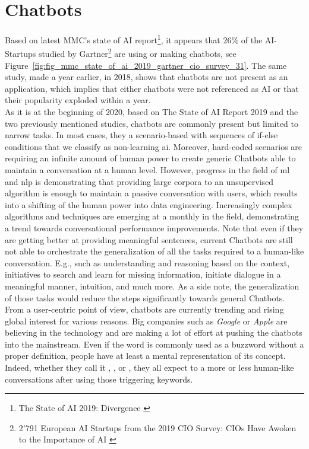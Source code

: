 \chapter{Chatbots}
\label{chap:chatbots}

Based on latest MMC's state of AI report\footnote{The State of AI 2019: Divergence \autocite{report:Kelnar2019}}, it appears that 26\% of the AI-Startups studied by Gartner\footnote{2'791 European AI Startups from the 2019 CIO Survey: CIOs Have Awoken to the Importance of AI \autocite{online:gartner_2019_ai_survey}} are using or making chatbots, see Figure~\ref{fig:fig_mmc_state_of_ai_2019_gartner_cio_survey_31}. The same study, made a year earlier, in 2018, shows that chatbots are not present as an application, which implies that either chatbots were not referenced as AI or that their popularity exploded within a year.\\

As it is at the beginning of 2020, based on The State of AI Report 2019 \autocite{studies:state_of_ai_2019} and the two previously mentioned studies, chatbots are commonly present but limited to narrow tasks. In most cases, they a scenario-based with sequences of if-else conditions that we classify as non-learning \gls{ai}. Moreover, hard-coded scenarios are requiring an infinite amount of human power to create generic Chatbots able to maintain a conversation at a human level. However, progress in the field of \gls{ml} and \gls{nlp} is demonstrating that providing large corpora to an unsupervised algorithm is enough to maintain a passive conversation with users, which results into a shifting of the human power into data engineering. Increasingly complex algorithms and techniques are emerging at a monthly in the field, demonstrating a trend towards conversational performance improvements. Note that even if they are getting better at providing meaningful sentences, current Chatbots are still not able to orchestrate the generalization of all the tasks required to a human-like conversation. E.g., such as understanding and reasoning based on the context, initiatives to search and learn for missing information, initiate dialogue in a meaningful manner, intuition, and much more. As a side note, the generalization of those tasks would reduce the steps significantly towards general Chatbots.\\

From a user-centric point of view, chatbots are currently trending and rising global interest for various reasons. Big companies such as \textit{Google} or \textit{Apple} are believing in the technology and are making a lot of effort at pushing the chatbots into the mainstream. Even if the word  is commonly used as a buzzword without a proper definition, people have at least a mental representation of its concept. Indeed, whether they call it , ,  or , they all expect to a more or less human-like conversations after using those triggering keywords.\\


